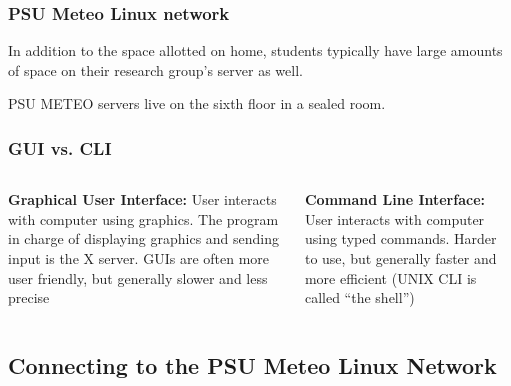 \documentclass[hyperref,pdfa,unicode,utf8,usepdftitle]{beamer}
\begin{document}
\begin{frame}
  \frametitle{PSU Meteo Linux network}
  In addition to the space allotted on home, students typically have
  large amounts of space on their research group’s server as well.

  PSU METEO servers live on the sixth floor in a sealed room.
\end{frame}

\begin{frame}
  \frametitle{GUI vs. CLI}
  \begin{columns}
    \begin{column}{0.5\textwidth}
      \textbf{Graphical User Interface:} User interacts with computer
      using graphics.  The program in charge of displaying graphics
      and sending input is the X server.  GUIs are often more user
      friendly, but generally slower and less precise
    \end{column}
    \begin{column}{0.5\textwidth}
      \textbf{Command Line Interface:} User interacts with computer
      using typed commands. Harder to use, but generally faster and
      more efficient (UNIX CLI is called “the shell”)
    \end{column}
  \end{columns}
\end{frame}

\subsection{Connecting to the PSU Meteo Linux Network}
\end{document}
